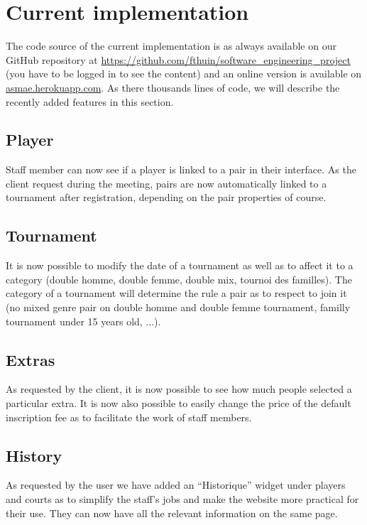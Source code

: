 \section{Current implementation}

The code source of the current implementation is as always available on our GitHub repository at \url{https://github.com/fthuin/software_engineering_project} (you have to be logged in to see the content) and an online version is available on \url{asmae.herokuapp.com}. As there thousands lines of code, we will describe the recently added features in this section.

\subsection{Player}

Staff member can now see if a player is linked to a pair in their interface. As the client request during the meeting, pairs are now automatically linked to a tournament after registration, depending on the pair properties of course.

\subsection{Tournament}

It is now possible to modify the date of a tournament as well as to affect it to a category (double homme, double femme, double mix, tournoi des familles). The category of a tournament will determine the rule a pair as to respect to join it (no mixed genre pair on double homme and double femme tournament, familly tournament under 15 years old, ...).

\subsection{Extras}

As requested by the client, it is now possible to see how much people selected a particular extra. It is now also possible to easily change the price of the default inscription fee as to facilitate the work of staff members.

\subsection{History}

As requested by the user we have added an \enquote{Historique} widget under players and courts as to simplify the staff's jobs and make the website more practical for their use. They can now have all the relevant information on the same page.

